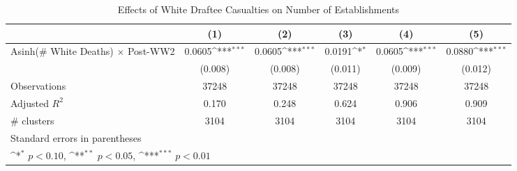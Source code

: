 \begin{table}[htbp]\centering
\def\sym#1{\ifmmode^{#1}\else\(^{#1}\)\fi}
\caption{Effects of White Draftee Casualties on Number of Establishments}
\begin{tabular}{l*{5}{c}}
\hline\hline
                    &\multicolumn{1}{c}{(1)}         &\multicolumn{1}{c}{(2)}         &\multicolumn{1}{c}{(3)}         &\multicolumn{1}{c}{(4)}         &\multicolumn{1}{c}{(5)}         \\
\hline
Asinh(\# White Deaths) $\times$ Post-WW2&      0.0605\sym{***}&      0.0605\sym{***}&      0.0191\sym{*}  &      0.0605\sym{***}&      0.0880\sym{***}\\
                    &     (0.008)         &     (0.008)         &     (0.011)         &     (0.009)         &     (0.012)         \\
\hline
Observations        &       37248         &       37248         &       37248         &       37248         &       37248         \\
Adjusted \(R^{2}\)  &       0.170         &       0.248         &       0.624         &       0.906         &       0.909         \\
\# clusters         &        3104         &        3104         &        3104         &        3104         &        3104         \\
\hline\hline
\multicolumn{6}{l}{\footnotesize Standard errors in parentheses}\\
\multicolumn{6}{l}{\footnotesize \sym{*} \(p<0.10\), \sym{**} \(p<0.05\), \sym{***} \(p<0.01\)}\\
\end{tabular}
\end{table}

